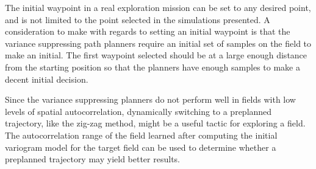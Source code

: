 The initial waypoint in a real exploration mission can be set to any desired point, and is not limited to the point selected in the simulations presented. A consideration to make with regards to setting an initial waypoint is that the variance suppressing path planners require an initial set of samples on the field to make an initial. The first waypoint selected should be at a large enough distance from the starting position so that the planners have enough samples to make a decent initial decision. 

Since the variance suppressing planners do not perform well in fields with low levels of spatial autocorrelation, dynamically switching to a preplanned trajectory, like the zig-zag method, might be a useful tactic for exploring a field. The autocorrelation range of the field learned after computing the initial variogram model for the target field can be used to determine whether a preplanned trajectory may yield better results.
